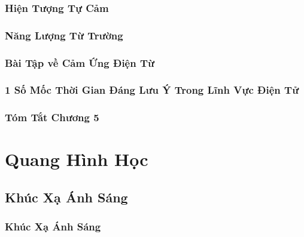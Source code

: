 \documentclass[oneside]{book}
\numberwithin{equation}{section}
\begin{document}

\section{Hiện Tượng Tự Cảm}


\section{Năng Lượng Từ Trường}


\section{Bài Tập về Cảm Ứng Điện Từ}


\section{1 Số Mốc Thời Gian Đáng Lưu Ý Trong Lĩnh Vực Điện Tử}


\section{Tóm Tắt Chương 5}


\part{Quang Hình Học}

\chapter{Khúc Xạ Ánh Sáng}

\section{Khúc Xạ Ánh Sáng}
\end{document}
